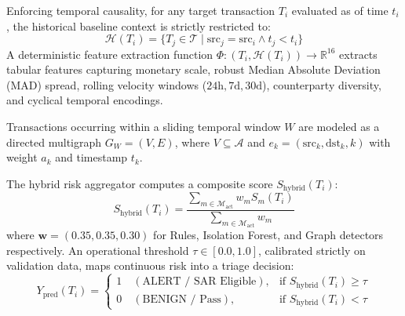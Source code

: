 \documentclass[10pt,journal,compsoc]{IEEEtran}
\begin{document}
Enforcing temporal causality, for any target transaction $T_i$ evaluated as of time $t_i$, the historical baseline context is strictly restricted to:
\begin{equation}
\mathcal{H}(T_i) = \{ T_j \in \mathcal{T} \mid \text{src}_j = \text{src}_i \land t_j < t_i \}
\end{equation}
A deterministic feature extraction function $\Phi: (T_i, \mathcal{H}(T_i)) \to \mathbb{R}^{16}$ extracts tabular features capturing monetary scale, robust Median Absolute Deviation (MAD) spread, rolling velocity windows ($24\text{h}, 7\text{d}, 30\text{d}$), counterparty diversity, and cyclical temporal encodings.

Transactions occurring within a sliding temporal window $W$ are modeled as a directed multigraph $G_W = (V, E)$, where $V \subseteq \mathcal{A}$ and $e_k = (\text{src}_k, \text{dst}_k, k)$ with weight $a_k$ and timestamp $t_k$.

The hybrid risk aggregator computes a composite score $S_{\text{hybrid}}(T_i)$:
\begin{equation}
S_{\text{hybrid}}(T_i) = \frac{\sum_{m \in \mathcal{M}_{\text{act}}} w_m S_m(T_i)}{\sum_{m \in \mathcal{M}_{\text{act}}} w_m}
\end{equation}
where $\mathbf{w} = (0.35, 0.35, 0.30)$ for Rules, Isolation Forest, and Graph detectors respectively. An operational threshold $\tau \in [0.0, 1.0]$, calibrated strictly on validation data, maps continuous risk into a triage decision:
\begin{equation}
Y_{\text{pred}}(T_i) = \begin{cases} 1 \quad (\text{ALERT / SAR Eligible}), & \text{if } S_{\text{hybrid}}(T_i) \ge \tau \\ 0 \quad (\text{BENIGN / Pass}), & \text{if } S_{\text{hybrid}}(T_i) < \tau \end{cases}
\end{equation}
\end{document}
